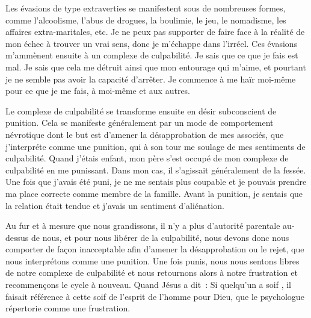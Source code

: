 Les évasions de type extraverties se manifestent sous de nombreuses formes,
 comme l'alcoolisme, l'abus de drogues, la boulimie, le jeu, le nomadisme,
 les affaires extra-maritales, etc.
 Je ne peux pas supporter de faire face à la réalité de mon échec à trouver
 un vrai sens, donc je m'échappe dans l'irréel.
 Ces évasions m'ammènent ensuite à un complexe de culpabilité.
 Je sais que ce que je fais est mal. Je sais que cela me détruit
 ainsi que mon entourage qui m'aime, et pourtant je ne semble pas avoir
 la capacité d'arrêter. Je commence à me haïr moi-même pour ce que je me fais,
 à moi-même et aux autres.

Le complexe de culpabilité se transforme ensuite en désir subconscient
 de punition. Cela se manifeste généralement par un mode de comportement
 névrotique dont le but est d'amener la désapprobation de mes associés,
 que j'interpréte comme une punition, qui à son tour me soulage
 de mes sentiments de culpabilité. Quand j'étais enfant, mon père
 s'est occupé de mon complexe de culpabilité en me punissant.
 Dans mon cas, il s'agissait généralement de la fessée.
 Une fois que j'avais été puni, je ne me sentais plus coupable
 et je pouvais prendre ma place correcte comme membre de la famille.
 Avant la punition, je sentais que la relation était tendue et j'avais
 un sentiment d'aliénation.

Au fur et à mesure que nous grandissons, il n'y a plus d'autorité parentale
 au-dessus de nous, et pour nous libérer de la culpabilité, nous devons donc
 nous comporter de façon inacceptable afin d'amener la désapprobation
 ou le rejet, que nous interprétons comme une punition.
 Une fois punis, nous nous sentons libres de notre complexe de culpabilité
 et nous retournons alors à notre frustration et recommençons le cycle
 à nouveau. Quand Jésus a dit~: \og Si quelqu'un a soif \fg{},
 il faisait référence à cette soif de l'esprit de l'homme pour Dieu,
 que le psychologue répertorie comme une frustration.


\closechapter
